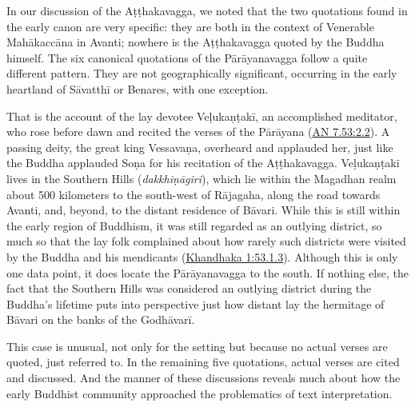 \documentclass[12pt,openany]{book}%
\begin{document}
In our discussion of the \textsanskrit{Aṭṭhakavagga}, we noted that the two quotations found in the early canon are very specific: they are both in the context of Venerable \textsanskrit{Mahākaccāna} in Avanti; nowhere is the \textsanskrit{Aṭṭhakavagga} quoted by the Buddha himself. The six canonical quotations of the \textsanskrit{Pārāyanavagga} follow a quite different pattern. They are not geographically significant, occurring in the early heartland of \textsanskrit{Sāvatthī} or Benares, with one exception.

That is the account of the lay devotee \textsanskrit{Veḷukaṇṭakī}, an accomplished meditator, who rose before dawn and recited the verses of the \textsanskrit{Pārāyana} (\href{https://suttacentral.net/an7.53/en/sujato\#2.2}{AN 7.53:2.2}). A passing deity, the great king \textsanskrit{Vessavaṇa}, overheard and applauded her, just like the Buddha applauded \textsanskrit{Soṇa} for his recitation of the \textsanskrit{Aṭṭhakavagga}. \textsanskrit{Veḷukaṇṭakī} lives in the Southern Hills (\textit{\textsanskrit{dakkhiṇāgiri}}), which lie within the Magadhan realm about 500 kilometers to the south-west of \textsanskrit{Rājagaha}, along the road towards Avanti, and, beyond, to the distant residence of \textsanskrit{Bāvari}. While this is still within the early region of Buddhism, it was still regarded as an outlying district, so much so that the lay folk complained about how rarely such districts were visited by the Buddha and his mendicants (\href{https://suttacentral.net/pli-tv-kd1/en/brahmali\#53.1.3}{Khandhaka 1:53.1.3}). Although this is only one data point, it does locate the \textsanskrit{Pārāyanavagga} to the south. If nothing else, the fact that the Southern Hills was considered an outlying district during the Buddha’s lifetime puts into perspective just how distant lay the hermitage of \textsanskrit{Bāvari} on the banks of the \textsanskrit{Godhāvarī}.

This case is unusual, not only for the setting but because no actual verses are quoted, just referred to. In the remaining five quotations, actual verses are cited and discussed. And the manner of these discussions reveals much about how the early Buddhist community approached the problematics of text interpretation.
\end{document}

